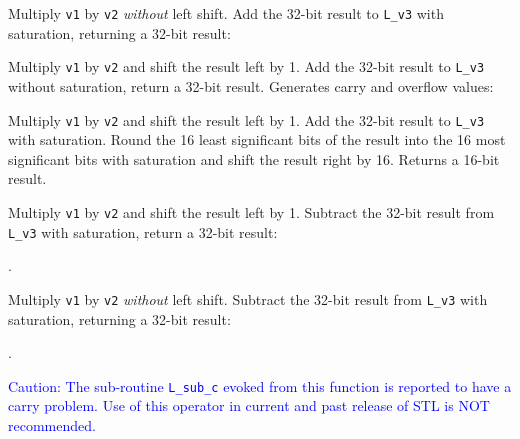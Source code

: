 Multiply {\tt v1} by {\tt v2} {\em without} left shift.
Add the 32-bit result to {\tt L\_v3} with saturation, returning a 32-bit result:



Multiply {\tt v1} by {\tt v2} and shift the result left by 1.
Add the 32-bit result to {\tt L\_v3} without saturation, return a 32-bit result.
Generates carry and overflow values:



Multiply {\tt v1} by {\tt v2} and shift the result left by 1.
Add the 32-bit result to {\tt L\_v3} with saturation.
Round the 16 least significant bits of the result into the 16 most significant bits with saturation and shift the result right by 16.
Returns a 16-bit result.



Multiply {\tt v1} by {\tt v2} and shift the result left by 1.
Subtract the 32-bit result from {\tt L\_v3} with saturation, return a 32-bit result:

.


Multiply {\tt v1} by {\tt v2} {\em without} left shift.
Subtract the 32-bit result from {\tt L\_v3} with saturation, returning a 32-bit result:

.


\textcolor{blue}{
%
Caution: The sub-routine {\tt L\_sub\_c} evoked from this function is reported to have a carry problem.
Use of this operator in current and past release of STL is NOT recommended.
%
}

